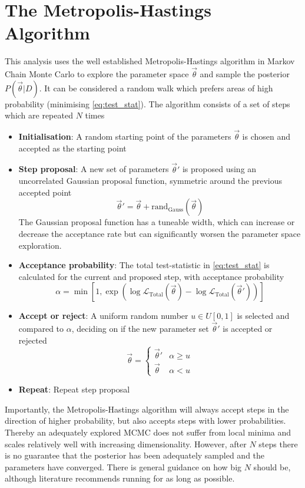 \section{The Metropolis-Hastings Algorithm}
This analysis uses the well established Metropolis-Hastings algorithm\cite{metropolis,hastings} in Markov Chain Monte Carlo to explore the parameter space $\vec{\theta}$ and sample the posterior $P(\vec{\theta}|D)$. It can be considered a random walk which prefers areas of high probability (minimising \autoref{eq:test_stat}). The algorithm consists of a set of steps which are repeated $N$ times
\begin{itemize}
	\item \textbf{Initialisation}: A random starting point of the parameters $\vec{\theta}$ is chosen and accepted as the starting point
	\item \textbf{Step proposal}: A new set of parameters $\vec{\theta}'$ is proposed using an uncorrelated Gaussian proposal function, symmetric around the previous accepted point
	\begin{equation}
		\vec{\theta}' = \vec{\theta}+\text{rand}_{\text{Gauss}}(\vec{\theta})
	\end{equation}
	The Gaussian proposal function has a tuneable width, which can increase or decrease the acceptance rate but can significantly worsen the parameter space exploration.
	\item \textbf{Acceptance probability}: The total test-statistic in \autoref{eq:test_stat} is calculated for the current and proposed step, with acceptance probability
	\begin{equation}
		\alpha = \min \left[ 1, \exp\left(\log\mathcal{L}_\text{Total}(\vec{\theta}) - \log\mathcal{L}_\text{Total}(\vec{\theta}') \right)\right]
	\end{equation}
	\item \textbf{Accept or reject}: A uniform random number $u \in U[0,1]$ is selected and compared to $\alpha$, deciding on if the new parameter set $\vec{\theta}'$ is accepted or rejected
	\begin{equation}
	\vec{\theta} =
	\begin{cases}
		\vec{\theta}' & \alpha \ge u \\
		\vec{\theta} & \alpha < u
	\end{cases}
	\end{equation}
	\item \textbf{Repeat}: Repeat step proposal
\end{itemize}
Importantly, the Metropolis-Hastings algorithm will always accept steps in the direction of higher probability, but also accepts steps with lower probabilities. Thereby an adequately explored MCMC does not suffer from local minima and scales relatively well with increasing dimensionality. However, after $N$ steps there is no guarantee that the posterior has been adequately sampled and the parameters have converged. There is general guidance on how big $N$ should be, although literature recommends running for as long as possible\cite{mcmc_handbook}.

